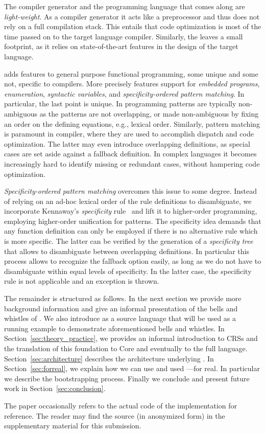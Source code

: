 The compiler generator \Tosca and the programming language that
comes along are \emph{light-weight}. As a compiler generator it acts
like a preprocessor and thus does not rely on a full compilation
stack. This entails that code optimization is most of the time passed
on to the target language compiler. Similarly, the \Tosca leaves
a small footprint, as it relies on state-of-the-art features in the
design of the target language.

\Tosca adds features to general purpose functional programming,
some unique and some not, specific to compilers. More precisely
\Tosca features support for \emph{embedded programs},
\emph{enumeration}, \emph{syntactic variables}, and
\emph{specificity-ordered pattern matching}.
%
In particular, the last point is unique. In programming patterns are
typically non-ambiguous as the patterns are not overlapping, or made
non-ambiguous by fixing an order on the defining equations, e.g.,
lexical order. Similarly, pattern matching is paramount in compiler,
where they are used to accomplish dispatch and code optimization. The
latter may even introduce overlapping definitions, as special cases
are set aside against a fallback definition. In complex languages it
becomes increasingly hard to identify missing or redundant cases,
without hampering code optimization.

\emph{Specificity-ordered pattern matching} overcomes this issue to
some degree.  Instead of relying on an ad-hoc lexical order of the
rule definitions to disambiguate, we incorporate Kennaway's
\emph{specificity} rule~\cite{1990_kennaway} and lift it to
higher-order programming, employing higher-order unification for
patterns.  The specificity idea demands that any function definition
can only be employed if there is no alternative rule which is more
specific. The latter can be verified by the generation of a
\emph{specificity tree} that allows to disambiguate between
overlapping definitions. In particular this process allows to
recognize the fallback option easily, as long as we do not have to
disambiguate within equal levels of specificity. In the latter case,
the specificity rule is not applicable and an exception is thrown.

The remainder is structured as follows. In the next section we provide
more background information and give an informal presentation of the
bells and whistles of \Tosca. We also introduce \MiniML as a source
language that will be used as a running example to demonstrate
aforementioned bells and whistles.  In
Section~\ref{sec:theory_practice}, we provides an informal
introduction to CRSs and the translation of this foundation to \Tosca
Core and eventually to the full \Tosca language.
Section~\ref{sec:architecture} describes the architecture underlying
\Tosca.  In Section~\ref{sec:forreal}, we explain how we can use and
used \Tosca---for real. In particular we describe the bootstrapping
process. Finally we conclude and present future work in
Section~\ref{sec:conclusion}.

The paper occasionally refers to the actual code of the implementation
for reference. The reader may find the source (in anonymized form) in
the supplementary material for this submission.

